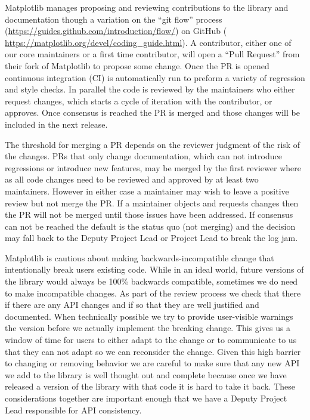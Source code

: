 \documentclass[12pt]{article}
\numberwithin{page}{section}
\begin{document}
Matplotlib manages proposing and reviewing contributions to the
library and documentation though a variation on the ``git flow''
process (\url{https://guides.github.com/introduction/flow/})
on GitHub (
\url{https://matplotlib.org/devel/coding_guide.html}).  A contributor,
either one of our core maintainers or a first time contributor, will
open a ``Pull Request'' from their fork of Matplotlib to propose some
change.  Once the PR is opened continuous integration (CI) is
automatically run to preform a variety of regression and style checks.
In parallel the code is reviewed by the maintainers who either request
changes, which starts a cycle of iteration with the contributor, or
approves.  Once consensus is reached the PR is merged and those
changes will be included in the next release.

The threshold for merging a PR depends on the reviewer judgment of the
risk of the changes.  PRs that only change documentation, which can
not introduce regressions or introduce new features, may be merged by
the first reviewer where as all code changes need to be reviewed and
approved by at least two maintainers.  However in either case a
maintainer may wish to leave a positive review but not merge the PR.
If a maintainer objects and requests changes then the PR will not be
merged until those issues have been addressed.  If consensus can not
be reached the default is the status quo (not merging) and the
decision may fall back to the Deputy Project Lead or Project Lead to
break the log jam.

Matplotlib is cautious about making backwards-incompatible change that
intentionally break users existing code.  While in an ideal world,
future versions of the library would always be 100\% backwards
compatible, sometimes we do need to make incompatible changes.  As
part of the review process we check that there if there are any API
changes and if so that they are well justified and documented.  When
technically possible we try to provide user-visible warnings the
version before we actually implement the breaking change.  This gives
us a window of time for users to either adapt to the change or to
communicate to us that they can not adapt so we can reconsider the
change.  Given this high barrier to changing or removing behavior we
are careful to make sure that any new API we add to the library is
well thought out and complete because once we have released a version
of the library with that code it is hard to take it back.  These
considerations together are important enough that we have a Deputy
Project Lead responsible for API consistency.
\end{document}
